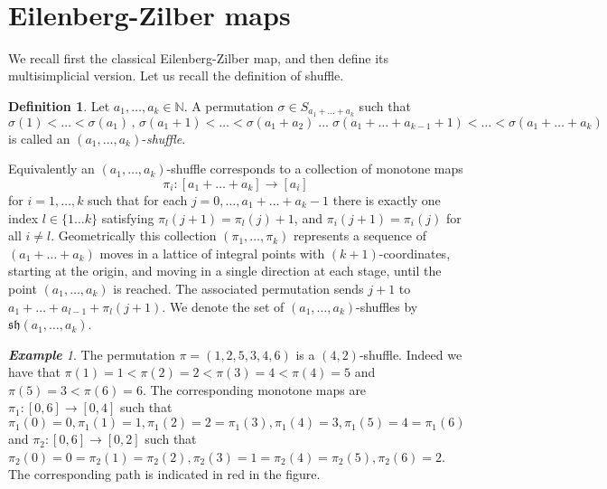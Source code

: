 \documentclass[a4paper,11pt]{article}
\theoremstyle{remark}
\newtheorem{example}[theorem]{\textbf{Example}}
\theoremstyle{definition}
\newtheorem{definition}[theorem]{Definition}
\begin{document}
\




\section{Eilenberg-Zilber maps}





We recall first the classical Eilenberg-Zilber map, and then define its multisimplicial version.
Let us recall the definition of shuffle.

\begin{definition}
Let $a_{1},\dots,a_{k}\in\mathbb{N}$. 
A permutation $\sigma\in S_{a_{1}+\dots+a_{k}}$ such that  $\sigma(1)<\dots<\sigma(a_{1})\, ,  \, \sigma(a_{1}+1)<\dots<\sigma(a_{1}+a_{2})\; \dots\; \sigma(a_{1}+\dots+a_{k-1}+1)<\dots<\sigma(a_{1}+\dots+a_{k})$  
is called an $(a_{1},\dots,a_{k})$-\textit{shuffle}.
\end{definition}



Equivalently an $(a_1,\dots,a_k)$-shuffle corresponds to a collection of monotone maps
$$\pi_i:[a_1+\dots+a_k] \to [a_i]$$ for $i=1,\dots,k$  such that for each $j=0,\dots,a_1+\dots+a_k-1$ there is exactly 
one index $l \in \{1 \dots k\}$ satisfying $\pi_l(j+1)=\pi_l(j)+1$, and $\pi_i(j+1)=\pi_i(j)$ for all $i \neq l$.
Geometrically this collection $(\pi_1,\dots,\pi_k)$ represents a sequence of $(a_1+\dots+a_k)$  moves in a lattice of integral points with $(k+1)$-coordinates, starting at the origin, and moving in a single direction at each stage, until the point $(a_1,\dots,a_k)$ is reached. 
The associated permutation sends $j+1$ to $a_1+\dots+a_{l-1}+\pi_l(j+1)$. 
We denote the set of $(a_1,\dots,a_k)$-shuffles by $\mathfrak{sh}(a_{1},\dots,a_{k})$.

\begin{example}
	\label{esempioshuffle}
The permutation  $\pi=(1, 2, 5, 3, 4, 6) $ is a $\left( 4,2\right)$-shuffle.
 Indeed we have that  $\pi(1)=1 < \pi(2)=2 < \pi(3)=4 < \pi(4)=5 $ and  $\pi(5)=3 < \pi(6)=6 $.
 The corresponding monotone maps are
 $\pi_1:[0,6] \to [0,4]$ such that 
 $\pi_1(0)=0, \pi_1(1)=1,  \pi_1(2)=2=\pi_1(3), \pi_1(4)=3, \pi_1(5)=4=\pi_1(6)$ and
 $\pi_2:[0,6] \to [0,2]$ such that $\pi_2(0)=0=\pi_2(1)=\pi_2(2), \pi_2(3)=1=\pi_2(4)=\pi_2(5), \pi_2(6)=2$.
 The corresponding path is indicated in red in the figure.
\end{example}
\end{document}
